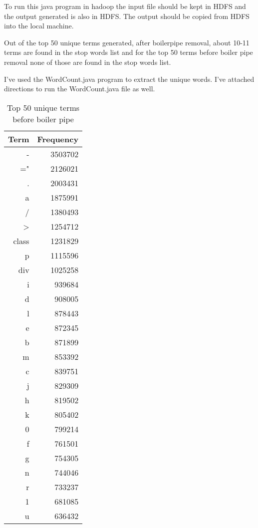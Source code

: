 \documentclass[12pt]{article} %
\begin{document}
To run this java program in hadoop the input file should be kept in HDFS and the output generated is also in HDFS. The output should be copied from HDFS into the local machine.

Out of the top 50 unique terms generated, after boilerpipe removal, about 10-11 terms are found in the stop words list and for the top 50 terms before boiler pipe removal none of those are found in the stop words list.

I've used the WordCount.java program to extract the unique words. I've attached directions to run the WordCount.java file as well.



\begin{table}[h]
\centering
\caption{Top 50 unique terms before boiler pipe}
\begin{tabular}{|r|r|}\hline
Term & Frequency \\ \hline
-	&	3503702	\\	\hline
="	&	2126021	\\	\hline
.	&	2003431	\\	\hline
a	&	1875991	\\	\hline
/	&	1380493	\\	\hline
>	&	1254712	\\	\hline
class	&	1231829	\\	\hline
p	&	1115596	\\	\hline
div	&	1025258	\\	\hline
i	&	939684	\\	\hline
d	&	908005	\\	\hline
l	&	878443	\\	\hline
e	&	872345	\\	\hline
b	&	871899	\\	\hline
m	&	853392	\\	\hline
c	&	839751	\\	\hline
j	&	829309	\\	\hline
h	&	819502	\\	\hline
k	&	805402	\\	\hline
0	&	799214	\\	\hline
f	&	761501	\\	\hline
g	&	754305	\\	\hline
n	&	744046	\\	\hline
r	&	733237	\\	\hline
1	&	681085	\\	\hline
u	&	636432	\\	\hline

\end{tabular}
\end{table}
\end{document}
